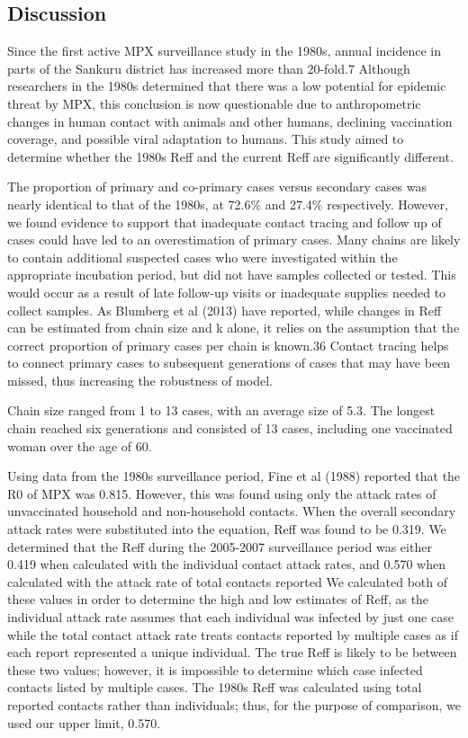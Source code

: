 \subsection{Discussion}

Since the first active MPX surveillance study in the 1980s, annual incidence in parts of the Sankuru district has increased more than 20-fold.7 Although researchers in the 1980s determined that there was a low potential for epidemic threat by MPX, this conclusion is now questionable due to anthropometric changes in human contact with animals and other humans, declining vaccination coverage, and possible viral adaptation to humans. This study aimed to determine whether the 1980s Reff and the current Reff are significantly different.

The proportion of primary and co-primary cases versus secondary cases was nearly identical to that of the 1980s, at 72.6\% and 27.4\% respectively. However, we found evidence to support that inadequate contact tracing and follow up of cases could have led to an overestimation of primary cases. Many chains are likely to contain additional suspected cases who were investigated within the appropriate incubation period, but did not have samples collected or tested. This would occur as a result of late follow-up visits or inadequate supplies needed to collect samples. As Blumberg et al (2013) have reported, while changes in Reff can be estimated from chain size and k alone, it relies on the assumption that the correct proportion of primary cases per chain is known.36 Contact tracing helps to connect primary cases to subsequent generations of cases that may have been missed, thus increasing the robustness of model. 

Chain size ranged from 1 to 13 cases, with an average size of 5.3. The longest chain reached six generations and consisted of 13 cases, including one vaccinated woman over the age of 60.

Using data from the 1980s surveillance period, Fine et al (1988) reported that the R0 of MPX was 0.815. However, this was found using only the attack rates of unvaccinated household and non-household contacts. When the overall secondary attack rates were substituted into the equation, Reff was found to be 0.319. We determined that the Reff during the 2005-2007 surveillance period was either 0.419 when calculated with the individual contact attack rates, and 0.570 when calculated with the attack rate of total contacts reported We calculated both of these values in order to determine the high and low estimates of Reff, as the individual attack rate assumes that each individual was infected by just one case while the total contact attack rate treats contacts reported by multiple cases as if each report represented a unique individual. The true Reff is likely to be between these two values; however, it is impossible to determine which case infected contacts listed by multiple cases. The 1980s Reff was calculated using total reported contacts rather than individuals; thus, for the purpose of comparison, we used our upper limit, 0.570. 

